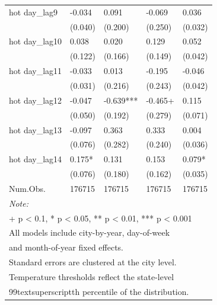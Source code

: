 \begin{table}
{\begin{tabular}[t]{lllll}
hot day_{lag9} & -0.034 & 0.091 & -0.069 & 0.036\\

 & (0.040) & (0.200) & (0.250) & (0.032)\\

hot day_{lag10} & 0.038 & 0.020 & 0.129 & 0.052\\

 & (0.122) & (0.166) & (0.149) & (0.042)\\

hot day_{lag11} & -0.033 & 0.013 & -0.195 & -0.046\\

 & (0.031) & (0.216) & (0.243) & (0.042)\\

hot day_{lag12} & -0.047 & -0.639*** & -0.465+ & 0.115\\

 & (0.050) & (0.192) & (0.279) & (0.071)\\

hot day_{lag13} & -0.097 & 0.363 & 0.333 & 0.004\\

 & (0.076) & (0.282) & (0.240) & (0.036)\\

hot day_{lag14} & 0.175* & 0.131 & 0.153 & 0.079*\\

 & (0.076) & (0.180) & (0.162) & (0.035)\\

Num.Obs. & 176715 & 176715 & 176715 & 176715\\
\bottomrule
\multicolumn{5}{l}{\rule{0pt}{1em}\textit{Note: }}\\
\multicolumn{5}{l}{\rule{0pt}{1em}+ p < 0.1, * p < 0.05, ** p < 0.01, *** p < 0.001}\\
\multicolumn{5}{l}{\rule{0pt}{1em}All models include city-by-year, day-of-week}\\
\multicolumn{5}{l}{\rule{0pt}{1em}and month-of-year fixed effects.}\\
\multicolumn{5}{l}{\rule{0pt}{1em}Standard errors are clustered at the city level.}\\
\multicolumn{5}{l}{\rule{0pt}{1em}Temperature thresholds reflect the state-level}\\
\multicolumn{5}{l}{\rule{0pt}{1em}99textsuperscript{th} percentile of the distribution.}\\
\end{tabular}}
\end{table}
